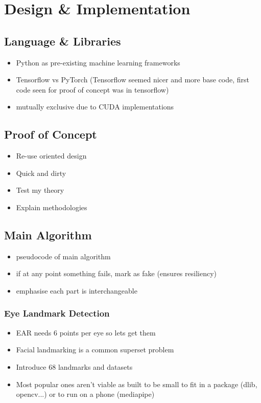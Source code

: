 \chapter{Design \& Implementation}
\label{ch:design-implementation}

\section{Language \& Libraries}

\begin{itemize}
    \item Python as pre-existing machine learning frameworks
    \item Tensorflow vs PyTorch (Tensorflow seemed nicer and more base code, first code seen for proof of concept was in tensorflow)
    \item mutually exclusive due to CUDA implementations
\end{itemize}

\section{Proof of Concept}

\begin{itemize}
    \item Re-use oriented design
    \item Quick and dirty
    \item Test my theory
    \item Explain methodologies
\end{itemize}

\section{Main Algorithm}

\begin{itemize}
    \item pseudocode of main algorithm
    \item if at any point something fails, mark as fake (ensures resiliency)
    \item emphasise each part is interchangeable
\end{itemize}

\subsection{Eye Landmark Detection}

\begin{itemize}
    \item EAR needs 6 points per eye so lets get them
    \item Facial landmarking is a common superset problem
    \item Introduce 68 landmarks and datasets
    \item Most popular ones aren't viable as built to be small to fit in a package (dlib, opencv...) or to run on a phone (mediapipe)
\end{itemize}

